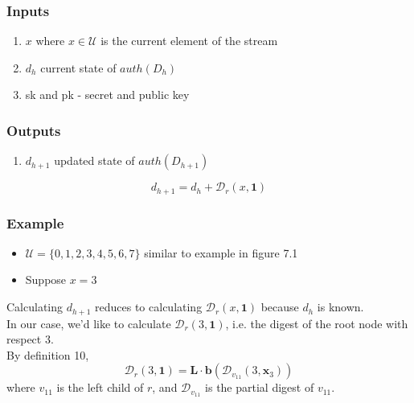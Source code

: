 \documentclass[11pt, letterpaper, oneside]{article}
\begin{document}
\subsubsection{Inputs}
	\begin{enumerate}
	\item $x$ where $x \in \mathcal{U}$ is the current element of the stream
	\item $d_{h}$ current state of $auth(D_{h})$
	\item sk and pk - secret and public key \\
	\end{enumerate}

\subsubsection{Outputs}
	\begin{enumerate}
	\item $d_{h + 1}$ updated state of $auth(D_{h + 1})$
	\end{enumerate}

	\begin{equation}
		d_{h+1} = d_{h} + \mathcal{D}_{r}(x, \textbf{1})
	\end{equation}

\subsubsection{Example}

	\begin{itemize}
	\item $\mathcal{U} = \{ 0, 1, 2, 3, 4, 5, 6, 7\}$ similar to example in figure 7.1
	\item Suppose $x = 3$
	\end{itemize}
	
	Calculating $d_{h + 1}$ reduces to calculating 	$ \mathcal{D}_{r}(x, \textbf{1})$ because $d_{h}$ is known.  \\

	In our case, we'd like to calculate $\mathcal{D}_{r}(3, \textbf{1})$, i.e. the digest of the root node with respect 3. \\

	By definition 10, 
	\begin{equation}
	\mathcal{D}_{r}(3, \textbf{1}) = \textbf{L} \cdot \textbf{b}(\mathcal{D}_{v_{11}}(3, \textbf{x}_{3})) 
	\end{equation}
where $v_{11}$ is the left child of $r$, and $\mathcal{D}_{v_{11}}$ is the partial digest of $v_{11}$.
\end{document}
